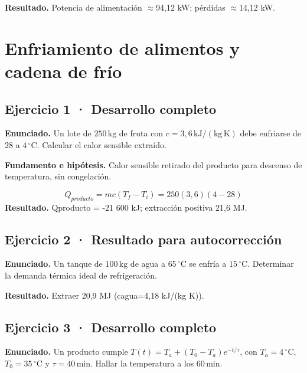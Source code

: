 \documentclass[11pt,a4paper]{article}
\begin{document}
\textbf{Resultado.} Potencia de alimentación \ensuremath{\approx}94,12 kW; pérdidas \ensuremath{\approx}14,12 kW.


\clearpage

\section{Enfriamiento de alimentos y cadena de frío}

\begin{center}\end{center}

\subsection*{Ejercicio 1 · Desarrollo completo}
\textbf{Enunciado.} Un lote de \(250\,\mathrm{kg}\) de fruta con \(c=3{,}6\,\mathrm{kJ/(kg\,K)}\) debe enfriarse de \(28\) a \(4\,^\circ\mathrm C\). Calcular el calor sensible extraído.

\textbf{Fundamento e hipótesis.} Calor sensible retirado del producto para descenso de temperatura, sin congelación.

\[
Q_{producto}=mc(T_f-T_i)=250(3{,}6)(4-28)
\]
\textbf{Resultado.} Qproducto = -21 600 kJ; extracción positiva 21,6 MJ.


\subsection*{Ejercicio 2 · Resultado para autocorrección}
\textbf{Enunciado.} Un tanque de \(100\,\mathrm{kg}\) de agua a \(65\,^\circ\mathrm C\) se enfría a \(15\,^\circ\mathrm C\). Determinar la demanda térmica ideal de refrigeración.

\textbf{Resultado.} Extraer 20,9 MJ (cagua=4,18 kJ/(kg K)).


\subsection*{Ejercicio 3 · Desarrollo completo}
\textbf{Enunciado.} Un producto cumple \(T(t)=T_a+(T_0-T_a)e^{-t/\tau}\), con \(T_a=4\,^\circ\mathrm C\), \(T_0=35\,^\circ\mathrm C\) y \(\tau=40\,\mathrm{min}\). Hallar la temperatura a los \(60\,\mathrm{min}\).
\end{document}

